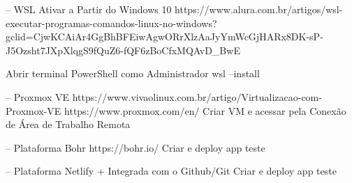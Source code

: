 -- WSL Ativar a Partir do Windows 10
https://www.alura.com.br/artigos/wsl-executar-programas-comandos-linux-no-windows?gclid=CjwKCAiAr4GgBhBFEiwAgwORrXlzAaJyYmWcGjHARx8DK-sP-J5Ozsht7JXpXlqgS9fQuZ6-fQF6zBoCfxMQAvD_BwE

Abrir terminal PowerShell como Administrador
wsl --install

-- Proxmox VE
https://www.vivaolinux.com.br/artigo/Virtualizacao-com-Proxmox-VE
https://www.proxmox.com/en/
Criar VM e acessar pela Conexão de Área de Trabalho Remota

-- Plataforma Bohr
https://bohr.io/
Criar e deploy app teste

-- Plataforma Netlify + Integrada com o Github/Git
Criar e deploy app teste